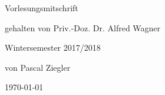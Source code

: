 \frontmatter

\begin{titlepage}
	\centering
	\vspace{2cm}
	{\LARGE Vorlesungsmitschrift \par}
	\vspace{1.5cm}
	{\Huge\bfseries \mytitle \par}
	\vspace{3.5cm}
	{\Large gehalten von Priv.-Doz. Dr. Alfred Wagner\par Wintersemester 2017/2018}
	\vfill
	\large  von Pascal Ziegler
	\vfill

	{\large \today\par}
\end{titlepage}


\newpage\thispagestyle{empty}~%

\newpage
\begin{large}
	\tableofcontents
\end{large}


\newpage


\listoftodos



\mainmatter



	
\backmatter
	

\newpage
{}
{}


